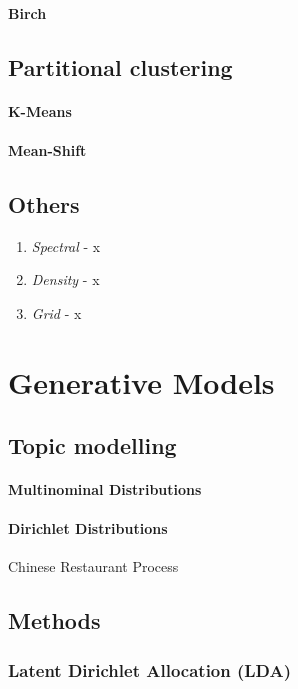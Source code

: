 \begin{itemize}
\begin{description}
    \paragraph{Birch}

  \subsection{Partitional clustering}
    \paragraph{K-Means}
    \paragraph{Mean-Shift}

    \subsection{Others}
      \begin{enumerate}
        \item \emph{Spectral} - x
        \item \emph{Density} - x
        \item \emph{Grid} - x
      \end{enumerate}


\section{Generative Models}    
  
  \subsection{Topic modelling}
    \paragraph{Multinominal Distributions}
    \paragraph{Dirichlet Distributions}
      Chinese Restaurant Process

  \subsection{Methods}
    \subsubsection{Latent Dirichlet Allocation (LDA)}

\end{description}
\end{itemize}
